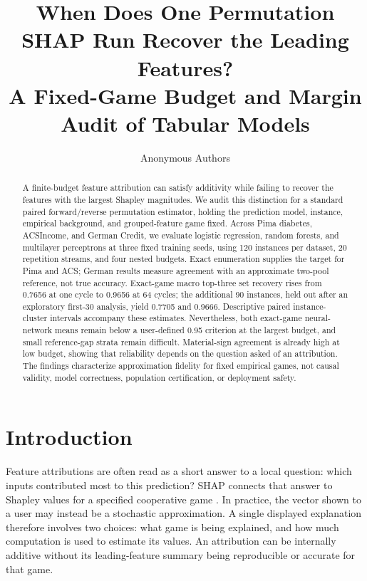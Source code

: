 \documentclass{article}
\title{When Does One Permutation SHAP Run Recover the Leading Features?\\A Fixed-Game Budget and Margin Audit of Tabular Models}
\author{Anonymous Authors}
\begin{document}
\maketitle

\begin{abstract}
A finite-budget feature attribution can satisfy additivity while failing to recover the features with the largest Shapley magnitudes. We audit this distinction for a standard paired forward/reverse permutation estimator, holding the prediction model, instance, empirical background, and grouped-feature game fixed. Across Pima diabetes, ACSIncome, and German Credit, we evaluate logistic regression, random forests, and multilayer perceptrons at three fixed training seeds, using 120 instances per dataset, 20 repetition streams, and four nested budgets. Exact enumeration supplies the target for Pima and ACS; German results measure agreement with an approximate two-pool reference, not true accuracy. Exact-game macro top-three set recovery rises from 0.7656 at one cycle to 0.9656 at 64 cycles; the additional 90 instances, held out after an exploratory first-30 analysis, yield 0.7705 and 0.9666. Descriptive paired instance-cluster intervals accompany these estimates. Nevertheless, both exact-game neural-network means remain below a user-defined 0.95 criterion at the largest budget, and small reference-gap strata remain difficult. Material-sign agreement is already high at low budget, showing that reliability depends on the question asked of an attribution. The findings characterize approximation fidelity for fixed empirical games, not causal validity, model correctness, population certification, or deployment safety.
\end{abstract}

\section{Introduction}
Feature attributions are often read as a short answer to a local question: which inputs contributed most to this prediction? SHAP connects that answer to Shapley values for a specified cooperative game \citep{lundberg2017shap}. In practice, the vector shown to a user may instead be a stochastic approximation. A single displayed explanation therefore involves two choices: what game is being explained, and how much computation is used to estimate its values. An attribution can be internally additive without its leading-feature summary being reproducible or accurate for that game.
\end{document}

